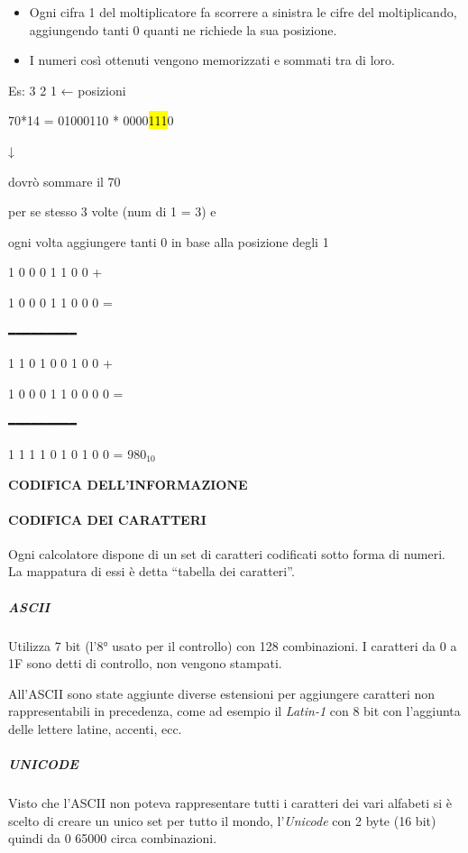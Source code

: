 \begin{itemize}
\item
  Ogni cifra 1 del moltiplicatore fa scorrere a sinistra le cifre del
  moltiplicando, aggiungendo tanti 0 quanti ne richiede la sua
  posizione.
\item
  I numeri così ottenuti vengono memorizzati e sommati tra di loro.
\end{itemize}

Es: 3 2 1 ← posizioni

70*14 = 01000110 * 0000\hl{111}0

↓

dovrò sommare il 70

per se stesso 3 volte (num di 1 = 3) e

ogni volta aggiungere tanti 0 in base alla posizione degli 1

1 0 0 0 1 1 0 0 +

1 0 0 0 1 1 0 0 0 =

━━━━━━━━━

1 1 0 1 0 0 1 0 0 +

1 0 0 0 1 1 0 0 0 0 =

━━━━━━━━━

1 1 1 1 0 1 0 1 0 0 = \(980_{10}\)

\textbf{CODIFICA DELL'INFORMAZIONE}

\paragraph{CODIFICA DEI CARATTERI}\label{codifica-dei-caratteri}

Ogni calcolatore dispone di un set di caratteri codificati sotto forma
di numeri. La mappatura di essi è detta ``tabella dei caratteri''.

\subparagraph{\texorpdfstring{\emph{ASCII}}{ASCII}}\label{ascii}

Utilizza 7 bit (l'8° usato per il controllo) con 128 combinazioni. I
caratteri da 0 a 1F sono detti di controllo, non vengono stampati.

All'ASCII sono state aggiunte diverse estensioni per aggiungere
caratteri non rappresentabili in precedenza, come ad esempio il
\emph{Latin-1} con 8 bit con l'aggiunta delle lettere latine, accenti,
ecc.

\subparagraph{\texorpdfstring{\emph{UNICODE}}{UNICODE}}\label{unicode}

Visto che l'ASCII non poteva rappresentare tutti i caratteri dei vari
alfabeti si è scelto di creare un unico set per tutto il mondo,
l'\emph{Unicode} con 2 byte (16 bit) quindi da 0 65000 circa
combinazioni.

